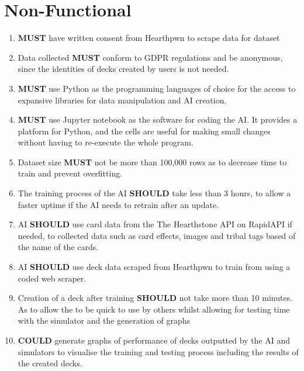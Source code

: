 \documentclass{report} %
\begin{document}
	\section{Non-Functional}
	\begin{enumerate}
		\item \textbf{MUST} have written consent from Hearthpwn to scrape data for dataset
		\item Data collected \textbf{MUST} conform to GDPR regulations and be anonymous, since the identities of decks created by users is not needed.
		\item \textbf{MUST} use Python as the programming languages of choice for the access to expansive libraries for data manipulation and AI creation.
		\item \textbf{MUST} use Jupyter notebook as the software for coding the AI. It provides a platform for Python, and the cells are useful for making small changes without having to re-execute the whole program.
		\item Dataset size \textbf{MUST} not be more than 100,000 rows as to decrease time to train and prevent overfitting.
		\item The training process of the AI \textbf{SHOULD} take less than 3 hours, to allow a faster uptime if the AI needs to retrain after an update.
		\item AI \textbf{SHOULD} use card data from the The Hearthstone API on RapidAPI if needed, to collected data such as card effects, images and tribal tags based of the name of the cards.
		\item AI \textbf{SHOULD} use deck data scraped from Hearthpwn to train from using a coded web scraper.
		\item Creation of a deck after training \textbf{SHOULD} not take more than 10 minutes. As to allow the to be quick to use by others whilst allowing for testing time with the simulator and the generation of graphs
		\item \textbf{COULD} generate graphs of performance of decks outputted by the AI and simulators to visualise the training and testing process including the results of the created decks. 
	\end{enumerate}



\end{document}

